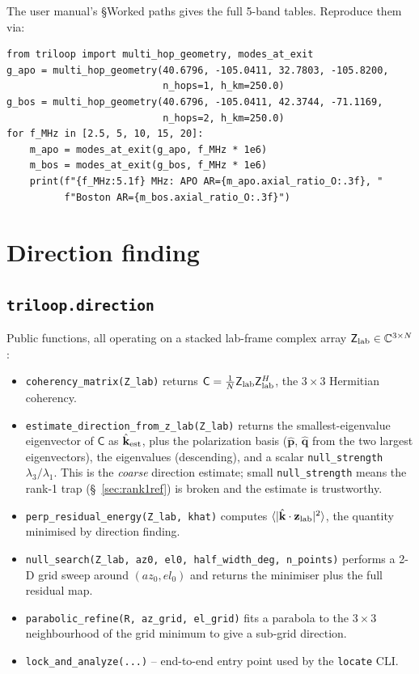 \documentclass[11pt]{article}
\begin{document}
The user manual's \S Worked paths gives the full 5-band tables.
Reproduce them via:
\begin{lstlisting}[style=py]
from triloop import multi_hop_geometry, modes_at_exit
g_apo = multi_hop_geometry(40.6796, -105.0411, 32.7803, -105.8200,
                           n_hops=1, h_km=250.0)
g_bos = multi_hop_geometry(40.6796, -105.0411, 42.3744, -71.1169,
                           n_hops=2, h_km=250.0)
for f_MHz in [2.5, 5, 10, 15, 20]:
    m_apo = modes_at_exit(g_apo, f_MHz * 1e6)
    m_bos = modes_at_exit(g_bos, f_MHz * 1e6)
    print(f"{f_MHz:5.1f} MHz: APO AR={m_apo.axial_ratio_O:.3f}, "
          f"Boston AR={m_bos.axial_ratio_O:.3f}")
\end{lstlisting}

\section{Direction finding}

\subsection{\texttt{triloop.direction}}

Public functions, all operating on a stacked lab-frame complex array
$\mathsf{Z}_{\rm lab}\in\mathbb{C}^{3\times N}$:

\begin{itemize}\itemsep=2pt
\item \texttt{coherency\_matrix(Z\_lab)} returns
      $\mathsf{C} = \tfrac{1}{N}\mathsf{Z}_{\rm lab}\mathsf{Z}_{\rm lab}^H$,
      the $3\times 3$ Hermitian coherency.
\item \texttt{estimate\_direction\_from\_z\_lab(Z\_lab)} returns the
      smallest-eigenvalue eigenvector of $\mathsf{C}$ as
      $\hat{\mathbf k}_{\rm est}$, plus the polarization basis
      ($\hat{\mathbf p}$, $\hat{\mathbf q}$ from the two largest
      eigenvectors), the eigenvalues (descending), and a scalar
      \texttt{null\_strength} $\lambda_3/\lambda_1$.  This is the
      \emph{coarse} direction estimate; small \texttt{null\_strength}
      means the rank-1 trap (\S~\ref{sec:rank1ref}) is broken and
      the estimate is trustworthy.
\item \texttt{perp\_residual\_energy(Z\_lab, khat)} computes
      $\langle |\hat{\mathbf k}\cdot \mathbf z_{\rm lab}|^2 \rangle$,
      the quantity minimised by direction finding.
\item \texttt{null\_search(Z\_lab, az0, el0, half\_width\_deg, n\_points)}
      performs a 2-D grid sweep around $(az_0, el_0)$ and returns the
      minimiser plus the full residual map.
\item \texttt{parabolic\_refine(R, az\_grid, el\_grid)} fits a
      parabola to the $3\!\times\!3$ neighbourhood of the grid
      minimum to give a sub-grid direction.
\item \texttt{lock\_and\_analyze(...)} -- end-to-end entry point used
      by the \texttt{locate} CLI.
\end{itemize}
\end{document}
